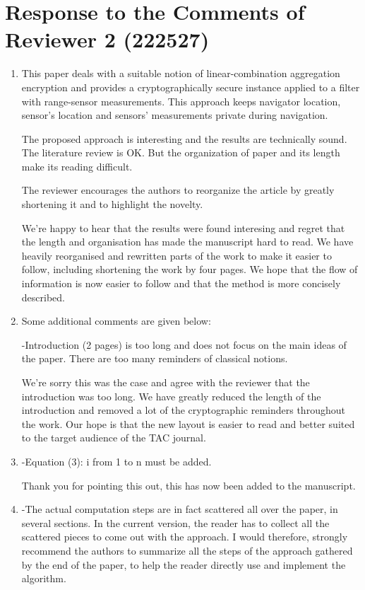 \documentclass[a4paper]{scrartcl}
\newenvironment{rebuttal}{\begin{enumerate}[label={\color{grey}\thesection.\arabic{enumi}},leftmargin=0pt,ref=\thesection.\arabic{enumi}]}{\end{enumerate}}
\newcommand{\reviewtext}[1]{{\color{nblue} #1}}
\begin{document}
\section*{Response to the Comments of Reviewer 2 (222527)}
\def\thesection{R2}
\begin{rebuttal}
\item \reviewtext{This paper deals with a suitable notion of linear-combination aggregation encryption and provides a cryptographically secure instance applied to a filter with range-sensor measurements. This approach keeps navigator location, sensor's location and sensors' measurements private during navigation.

The proposed approach is interesting and the results are technically sound. The literature review is OK. But the organization of paper and its length make its reading difficult.

The reviewer encourages the authors to reorganize the article by greatly shortening it and to highlight the novelty.}

We're happy to hear that the results were found interesing and regret that the length and organisation has made the manuscript hard to read. We have heavily reorganised and rewritten parts of the work to make it easier to follow, including shortening the work by four pages. We hope that the flow of information is now easier to follow and that the method is more concisely described.

\item \reviewtext{Some additional comments are given below:

-Introduction (2 pages) is too long and does not focus on the main ideas of the paper. There are too many reminders of classical notions.}

We're sorry this was the case and agree with the reviewer that the introduction was too long. We have greatly reduced the length of the introduction and removed a lot of the cryptographic reminders throughout the work. Our hope is that the new layout is easier to read and better suited to the target audience of the TAC journal.

\item \reviewtext{-Equation (3): i from 1 to n must be added.}

Thank you for pointing this out, this has now been added to the manuscript.

\item \reviewtext{-The actual computation steps are in fact scattered all over the paper, in several sections.  In the current version, the reader has to collect all the scattered pieces to come out with the approach. I would therefore, strongly recommend the authors to summarize all the steps of the approach gathered by the end of the paper, to help the reader directly use and implement the algorithm.}


\end{rebuttal}
\end{document}
